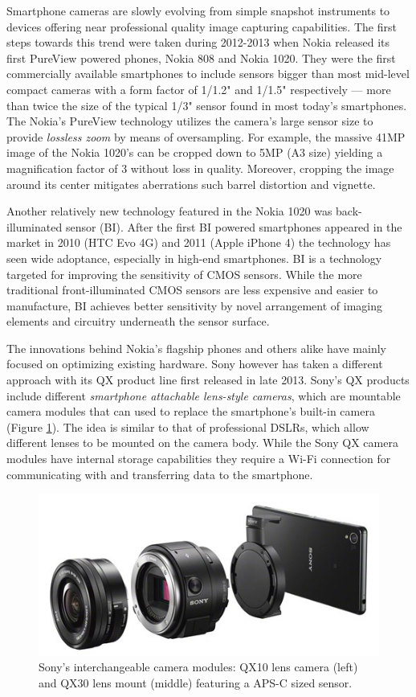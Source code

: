 \documentclass[thesis.tex]{subfiles}
\begin{document}
Smartphone cameras are slowly evolving from simple snapshot instruments to devices offering near professional quality image capturing capabilities. The first steps towards this trend were taken during 2012-2013 when Nokia released its first PureView powered phones, Nokia 808 and Nokia 1020. They were the first commercially available smartphones to include sensors bigger than most mid-level compact cameras with a form factor of 1/1.2" and 1/1.5" respectively --- more than twice the size of the typical 1/3" sensor found in most today's smartphones. The Nokia's PureView technology utilizes the camera's large sensor size to provide \textit{lossless zoom} by means of oversampling. For example, the massive 41MP image of the Nokia 1020's can be cropped down to 5MP (A3 size) yielding a magnification factor of 3 without loss in quality. Moreover, cropping the image around its center mitigates aberrations such barrel distortion and vignette. \cite{lumia_1020}

Another relatively new technology featured in the Nokia 1020 was back-illuminated sensor (BI). After the first BI powered smartphones appeared in the market in 2010 (HTC Evo 4G) and 2011 (Apple iPhone 4) the technology has seen wide adoptance, especially in high-end smartphones. BI is a technology targeted for improving the sensitivity of CMOS sensors. While the more traditional front-illuminated CMOS sensors are less expensive and easier to manufacture, BI achieves better sensitivity by novel arrangement of imaging elements and circuitry underneath the sensor surface.

The innovations behind Nokia's flagship phones and others alike have mainly focused on optimizing existing hardware. Sony however has taken a different approach with its QX product line first released in late 2013. Sony's QX products include different \textit{smartphone attachable lens-style cameras}, which are mountable camera modules that can used to replace the smartphone's built-in camera (Figure \ref{figure:sony-qx}). The idea is similar to that of professional DSLRs, which allow different lenses to be mounted on the camera body. While the Sony QX camera modules have internal storage capabilities they require a Wi-Fi connection for communicating with and transferring data to the smartphone.

\begin{figure}[ht]
\centering \includegraphics[width=\textwidth]{images/sony_qx.jpg}
\caption{Sony's interchangeable camera modules: QX10 lens camera (left) and QX30 lens mount (middle) featuring a APS-C sized sensor.\label{figure:sony-qx}}
\end{figure}
\end{document}
